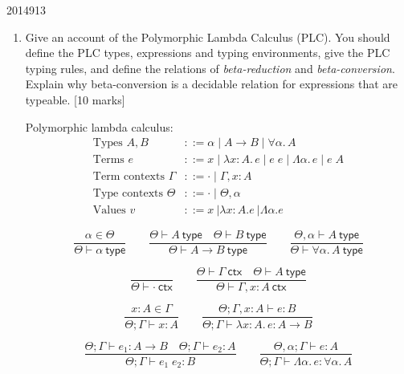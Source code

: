 \documentclass[10pt,\jkfside,a4paper]{article}
\newcommand{\answer}[1]{
    \begin{tcolorbox}[colframe=black, colback=white, sharp corners, boxrule=0.2mm, breakable]
        #1
    \end{tcolorbox}
}
\newcommand{\qmarks}[1]{\hspace*{\fill}[#1]}
\begin{document}
\begin{examquestion}{2014}{9}{13}
    \begin{enumerate}
        \item
            Give an account of the Polymorphic Lambda Calculus (PLC). You should define
            the PLC types, expressions and typing environments, give the PLC typing
            rules, and define the relations of \emph{beta-reduction} and
            \emph{beta-conversion}. Explain why beta-conversion is a decidable relation
            for expressions that are typeable. \qmarks{10 marks}

            \answer{
                Polymorphic lambda calculus:
                \begin{align*}
                    \text{Types } A, B &::= \alpha \mid A \to B \mid \forall \alpha.\, A \\
                    \text{Terms } e &::= x \mid \lambda x : A.\, e \mid e\;e \mid \Lambda \alpha.\, e \mid e\;A \\
                    \text{Term contexts } \Gamma &::= \cdot \mid \Gamma, x : A \\
                    \text{Type contexts } \Theta &::= \cdot \mid \Theta, \alpha \\
                    \text{Values } v &::= x\ | \lambda x: A. e\ | \Lambda \alpha. e
                \end{align*}

                \[
                    \frac{\alpha \in \Theta}{\Theta \vdash \alpha\ \mathsf{type}}
                    \qquad
                    \frac{\Theta \vdash A\ \mathsf{type} \quad \Theta \vdash B\ \mathsf{type}}{\Theta \vdash A \to B\ \mathsf{type}}
                    \qquad
                    \frac{\Theta, \alpha \vdash A\ \mathsf{type}}{\Theta \vdash \forall \alpha.\, A\ \mathsf{type}}
                \]

                \[
                    \frac{}{\Theta \vdash \cdot\ \mathsf{ctx}}
                    \qquad
                    \frac{\Theta \vdash \Gamma\ \mathsf{ctx} \quad \Theta \vdash A\ \mathsf{type}}{\Theta \vdash \Gamma, x : A\ \mathsf{ctx}}
                \]

                \[
                    \frac{x : A \in \Gamma}{\Theta; \Gamma \vdash x : A}
                    \qquad
                    \frac{\Theta; \Gamma, x : A \vdash e : B}{\Theta; \Gamma \vdash \lambda x : A.\, e : A \to B}
                \]

                \[
                    \frac{\Theta; \Gamma \vdash e_1 : A \to B \quad \Theta; \Gamma \vdash e_2 : A}{\Theta; \Gamma \vdash e_1\;e_2 : B}
                    \qquad
                    \frac{\Theta, \alpha; \Gamma \vdash e : A}{\Theta; \Gamma \vdash \Lambda \alpha.\, e : \forall \alpha.\, A}
                \]

}
\end{enumerate}
\end{examquestion}
\end{document}
